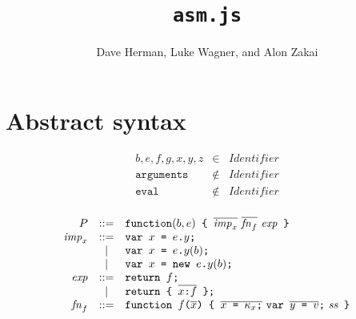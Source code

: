 \documentclass{article}
\newcommand{\seq}[1]{\overline{{#1}}}
\newcommand{\mathjs}[1]{\mbox{\texttt{{#1}}}}
\newcommand{\return}[1]{\mathjs{return }{#1}\mathjs{;}}
\newcommand{\fun}[3]{\mathjs{function }{#1}\mathjs{(}{#2}\mathjs{) \{ }{#3}\mathjs{ \}}}
\newcommand{\var}[1]{\mathjs{var }{#1}\mathjs{;}}
\newcommand{\function}{\mathtt{function}}
\begin{document}
\title{\texttt{asm.js}}
\author{Dave Herman, Luke Wagner, and Alon Zakai}
\maketitle

\section{Abstract syntax}

\[
\begin{array}{rcl}
b, e, f, g, x, y, z & \in & \mathit{Identifier} \\
\mathtt{arguments} & \not\in & \mathit{Identifier} \\
\mathtt{eval} & \not\in & \mathit{Identifier} \\
\end{array}
\]

\[
\begin{array}{rcl}
P               & ::= & \function(b, e)\mathjs{ \{ } \seq{\mathit{imp}_x}\ \seq{\mathit{fn}_f}\ \mathit{exp}\mathjs{ \}} \\
\mathit{imp}_x  & ::= & \var{x \mathjs{ = } e\mathjs{.}y} \\
                &  |  & \var{x \mathjs{ = } e\mathjs{.}y(b)} \\
                &  |  & \var{x \mathjs{ = } \mathjs{new }e\mathjs{.}y(b)} \\
\mathit{exp}    & ::= & \return{f} \\
                &  |  & \return{\mathjs{\{ } \seq{x \mathjs{:} f} \mathjs{ \}}} \\
\mathit{fn}_f   & ::= & \fun{f}{\seq{x}}{\seq{x\mathjs{ = }\kappa_x\mathjs{;}}\ \var{\seq{y\mathjs{ = }v}}\ \mathit{ss}} \\
\end{array}
\]
\end{document}
